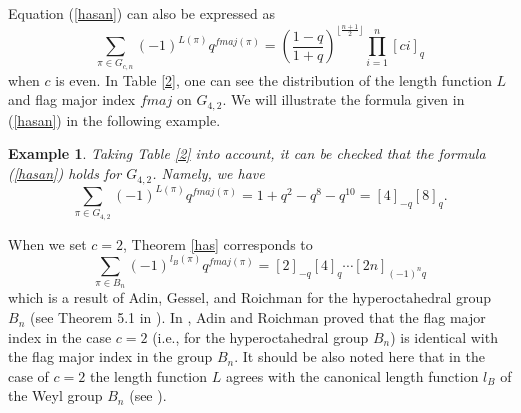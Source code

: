 \documentclass[a4paper,12pt]{article}
\newtheorem{ex}[thm]{Example}
\begin{document}
Equation (\ref{hasan}) can also be expressed as
\begin{equation}\label{bce2012}
\sum_{\pi \in G_{c,n}} (-1)^{L(\pi)} q^{fmaj(\pi)}= \left( \frac{1-q}{1+q}\right)^{\lfloor{\frac{n+1}{2}}\rfloor} \prod_{i=1}^n [ci]_q
\end{equation}
when $c$ is even. In Table \ref{2}, one can see the distribution of the length function $L$ and flag major index $fmaj$ on $G_{4,2}$. We will illustrate the formula given in (\ref{hasan}) in the following example.

\begin{ex}
Taking Table \ref{2} into account, it can be checked that the formula (\ref{hasan}) holds for $G_{4,2}$. Namely, we have
$$\sum_{\pi \in G_{4,2}} (-1)^{L(\pi)} q^{fmaj(\pi)}=1+q^2-q^8-q^{10}=[4]_{-q}[8]_q.$$
\end{ex}

When we set $c=2$, Theorem \ref{has} corresponds to 
$$\sum_{\pi \in B_n} (-1)^{l_B(\pi)} q^{fmaj(\pi)}=[2]_{-q}[4]_q\cdots [2n]_{(-1)^{n}q}$$
which is a result of Adin, Gessel, and Roichman for the hyperoctahedral group $B_n$ (see Theorem 5.1 in \cite{adin2005}). In \cite{adin2001}, Adin and Roichman proved that the flag major index in the case $c=2$ (i.e., for the hyperoctahedral group $B_n$) is identical with the flag major index in the group $B_n$. It should be also noted here that in the case of $c = 2$ the length function $L$ agrees with the canonical length function $l_B$ of the Weyl group $B_n$ (see \cite{bremke1997}).
\end{document}
